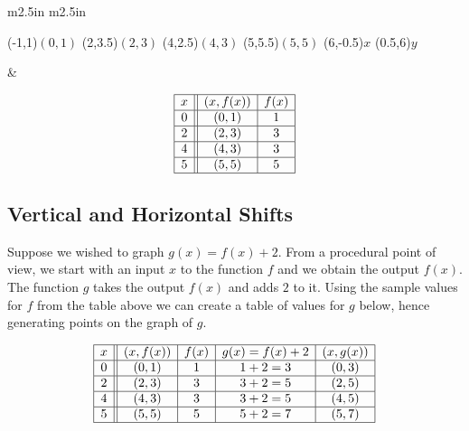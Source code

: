 \begin{center}

\begin{tabular}{m{2.5in} m{2.5in}}

\begin{mfpic}[15]{-1}{6}{-1}{6}
\tlabel[cc](-1,1){\scriptsize $(0,1)$}
\tlabel[cc](2,3.5){\scriptsize $(2,3)$}
\tlabel[cc](4,2.5){\scriptsize $(4,3)$}
\tlabel[cc](5,5.5){\scriptsize $(5,5)$}
\tlabel[cc](6,-0.5){\scriptsize $x$}
\tlabel[cc](0.5,6){\scriptsize $y$}
\axes
{}
\tlpointsep{4pt}
\penwd{1.25pt}
\end{mfpic}


&

\[ \begin{array}{|c||c|c|}  

\hline

 x & (x,f(x)) & f(x)  \\ \hline
0  & (0,1)& 1  \\  \hline
2 & (2,3) & 3  \\  \hline
4 & (4,3) & 3  \\  \hline
5 & (5,5) & 5 \\  \hline

\end{array} \] 



\end{tabular}

\end{center}

\subsection{Vertical and Horizontal Shifts}
\label{shifts}

Suppose we wished to graph $g(x) = f(x) + 2$.  From a procedural point of view,  we start with an input $x$ to the function $f$ and we obtain the output $f(x)$.  The function $g$ takes the output $f(x)$ and adds $2$ to it.  Using the sample values for $f$ from the table above we can create a table of values for $g$ below, hence generating points on the graph of $g$.


\[ \begin{array}{|c||c|c|c|c|}  

\hline

 x & (x,f(x)) & f(x) & g(x)=f(x)+2 & (x, g(x)) \\ \hline
0  & (0,1)& 1 & 1+2 = 3 &(0, 3) \\  \hline
2 & (2,3) & 3 & 3 + 2 =  5 &(2,5) \\  \hline
4 & (4,3) & 3 & 3 + 2 =  5 &(4, 5) \\  \hline
5 & (5,5) & 5 & 5+2 =  7 &( 5 ,7) \\  \hline

\end{array} \] 

